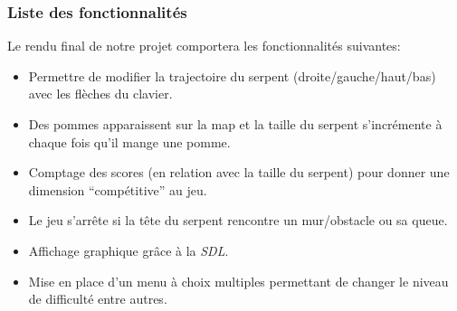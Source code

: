        \subsubsection{Liste des fonctionnalités}\label{sssect:fonctionnalites}
            Le rendu final de notre projet comportera les fonctionnalités suivantes:
            \begin{itemize}
            
                \item Permettre de modifier la trajectoire du serpent (droite/gauche/haut/bas) avec les flèches du clavier.
                \item Des pommes apparaissent sur la map et la taille du serpent s’incrémente à chaque fois qu’il mange une pomme.  
                \item Comptage des scores (en relation avec la taille du serpent) pour donner une dimension \enquote{compétitive} au jeu. 
                \item Le jeu s’arrête si la tête du serpent rencontre un mur/obstacle ou sa queue.
                \item Affichage graphique grâce à la \textit{SDL}.
                \item Mise en place d'un menu à choix multiples permettant de changer le niveau de difficulté entre autres.
                
            \end{itemize}


        \clearpage
        
